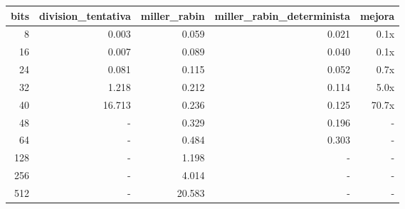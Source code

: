 \begin{tabular}{rrrrr}
\toprule
bits & division\_tentativa & miller\_rabin & miller\_rabin\_determinista & mejora \\
\midrule
8 & 0.003 & 0.059 & 0.021 & 0.1x \\
16 & 0.007 & 0.089 & 0.040 & 0.1x \\
24 & 0.081 & 0.115 & 0.052 & 0.7x \\
32 & 1.218 & 0.212 & 0.114 & 5.0x \\
40 & 16.713 & 0.236 & 0.125 & 70.7x \\
48 & - & 0.329 & 0.196 & - \\
64 & - & 0.484 & 0.303 & - \\
128 & - & 1.198 & - & - \\
256 & - & 4.014 & - & - \\
512 & - & 20.583 & - & - \\
\bottomrule
\end{tabular}
